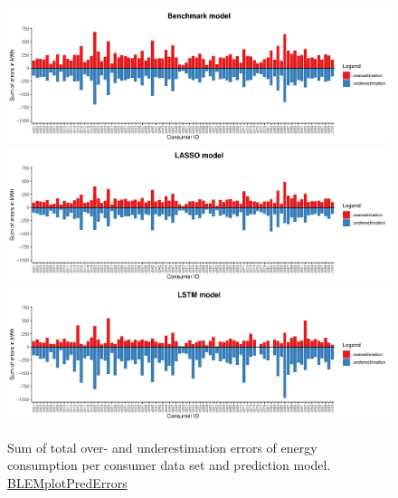 \begin{figure}
    \centering
    \includegraphics[width=\textwidth]{thesis/graphs/evaluation/c_barplot_naive_overunderestimation.pdf}\\\vspace{.6cm}
    \includegraphics[width=\textwidth]{thesis/graphs/evaluation/c_barplot_LASSO_overunderestimation.pdf}\\\vspace{.6cm}
    \includegraphics[width=\textwidth]{thesis/graphs/evaluation/c_barplot_LSTM_overunderestimation.pdf}
    \caption[Sum of total over- and underestimation errors per consumer data set]{Sum of total over- and underestimation errors of energy consumption per consumer data set and prediction model. \quantnet\href{ }{BLEMplotPredErrors}}
    \label{Fig:overunderestimation}
\end{figure}
% 

